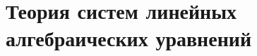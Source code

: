 \documentclass[../main.tex]{subfiles}
\begin{document}
\chapter{Теория систем линейных алгебраических уравнений}



\end{document}
